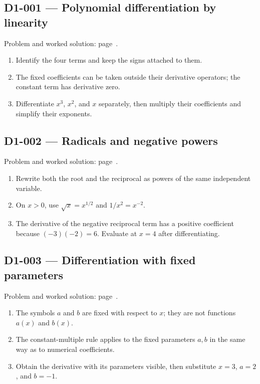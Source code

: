 \documentclass[11pt,oneside,openany]{book}
\begin{document}
\subsection*{D1-001 --- Polynomial differentiation by linearity}
\label{hints:D1-001}
Problem and worked solution: page~\pageref{problem:D1-001}.

\begin{enumerate}
\item Identify the four terms and keep the signs attached to them.
\item The fixed coefficients can be taken outside their derivative operators; the constant term has derivative zero.
\item Differentiate \(x^3\), \(x^2\), and \(x\) separately, then multiply their coefficients and simplify their exponents.
\end{enumerate}
\subsection*{D1-002 --- Radicals and negative powers}
\label{hints:D1-002}
Problem and worked solution: page~\pageref{problem:D1-002}.

\begin{enumerate}
\item Rewrite both the root and the reciprocal as powers of the same independent variable.
\item On \(x>0\), use \(\sqrt{x}=x^{1/2}\) and \(1/x^2=x^{-2}\).
\item The derivative of the negative reciprocal term has a positive coefficient because \((-3)(-2)=6\). Evaluate at \(x=4\) after differentiating.
\end{enumerate}
\subsection*{D1-003 --- Differentiation with fixed parameters}
\label{hints:D1-003}
Problem and worked solution: page~\pageref{problem:D1-003}.

\begin{enumerate}
\item The symbols \(a\) and \(b\) are fixed with respect to \(x\); they are not functions \(a(x)\) and \(b(x)\).
\item The constant-multiple rule applies to the fixed parameters \(a,b\) in the same way as to numerical coefficients.
\item Obtain the derivative with its parameters visible, then substitute \(x=3\), \(a=2\), and \(b=-1\).
\end{enumerate}
\end{document}
